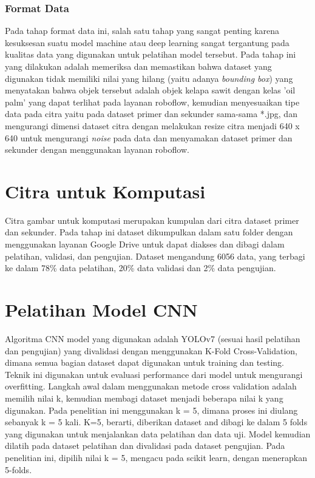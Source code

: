 \subsubsection{Format Data}
\hspace{1,2cm}Pada tahap format data ini, salah satu tahap yang sangat penting karena kesuksesan suatu model machine atau deep learning sangat tergantung pada kualitas data yang digunakan untuk pelatihan model tersebut. Pada tahap ini yang dilakukan adalah memeriksa dan memastikan bahwa dataset yang digunakan tidak memiliki nilai yang hilang (yaitu adanya \textit{bounding box}) yang menyatakan bahwa objek tersebut adalah objek kelapa sawit dengan kelas 'oil palm' yang dapat terlihat pada layanan roboflow, kemudian menyesuaikan tipe data pada citra yaitu pada dataset primer dan sekunder sama-sama *.jpg, dan mengurangi dimensi dataset citra dengan melakukan resize citra menjadi 640 x 640 untuk mengurangi \textit{noise} pada data dan menyamakan dataset primer dan sekunder dengan menggunakan layanan roboflow.

\section{Citra untuk Komputasi}
\hspace{1,2cm}	Citra gambar untuk komputasi merupakan kumpulan dari citra dataset primer dan sekunder. Pada tahap ini dataset dikumpulkan dalam satu folder dengan menggunakan layanan Google Drive untuk dapat diakses dan dibagi dalam pelatihan, validasi, dan pengujian. Dataset mengandung 6056 data, yang terbagi ke dalam 78\% data pelatihan, 20\% data validasi dan 2\% data pengujian.

\section{Pelatihan Model CNN}
\hspace{1,2cm}Algoritma CNN model yang digunakan adalah YOLOv7 (sesuai hasil pelatihan dan pengujian) yang divalidasi dengan menggunakan K-Fold Cross-Validation, dimana semua bagian dataset dapat digunakan untuk training dan testing. Teknik ini digunakan untuk evaluasi performance dari model untuk mengurangi overfitting. Langkah awal dalam menggunakan metode cross validation adalah memilih nilai k, kemudian membagi dataset menjadi beberapa nilai k yang digunakan.  Pada penelitian ini menggunakan k = 5, dimana proses ini diulang sebanyak k = 5 kali. K=5, berarti, diberikan dataset and dibagi ke dalam 5 folds yang digunakan untuk menjalankan data pelatihan dan data uji. Model kemudian dilatih pada dataset pelatihan dan divalidasi pada dataset pengujian.  Pada penelitian ini, dipilih nilai k = 5, mengacu pada scikit learn, dengan menerapkan 5-folds. 

